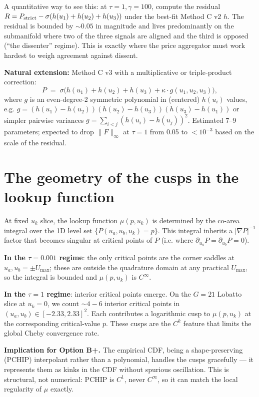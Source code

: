 \documentclass[11pt]{article}
\begin{document}
A quantitative way to see this: at $\tau = 1, \gamma = 100$, compute
the residual $R = P_{\rm strict} - \sigma(h(u_1) + h(u_2) + h(u_3))$
under the best-fit Method C v2 $h$. The residual is bounded by
$\sim 0.05$ in magnitude and lives predominantly on the submanifold
where two of the three signals are aligned and the third is opposed
(``the dissenter'' regime). This is exactly where the price aggregator
must work hardest to weigh agreement against dissent.

\textbf{Natural extension:} Method C v3 with a multiplicative or
triple-product correction:
\[
  P \;=\; \sigma\bigl(h(u_1) + h(u_2) + h(u_3) + \kappa \cdot g(u_1, u_2, u_3)\bigr),
\]
where $g$ is an even-degree-2 symmetric polynomial in (centered)
$h(u_i)$ values, e.g. $g = (h(u_1) - h(u_2))(h(u_2) - h(u_3))(h(u_3) - h(u_1))$
or simpler pairwise variances $g = \sum_{i < j} (h(u_i) - h(u_j))^2$.
Estimated 7--9 parameters; expected to drop $\|F\|_\infty$ at $\tau{=}1$
from 0.05 to $< 10^{-3}$ based on the scale of the residual.

\section{The geometry of the cusps in the lookup function}

At fixed $u_k$ slice, the lookup function $\mu(p, u_k)$ is determined
by the co-area integral over the 1D level set $\{P(u_a, u_b, u_k) = p\}$.
This integral inherits a $|\nabla P|^{-1}$ factor that becomes singular
at critical points of $P$ (i.e. where $\partial_{u_a} P = \partial_{u_b} P = 0$).

\textbf{In the $\tau = 0.001$ regime}: the only critical points are
the corner saddles at $u_a, u_b = \pm U_{\max}$; these are outside the
quadrature domain at any practical $U_{\max}$, so the integral is
bounded and $\mu(p, u_k)$ is $C^\infty$.

\textbf{In the $\tau = 1$ regime}: interior critical points emerge.
On the $G{=}21$ Lobatto slice at $u_k = 0$, we count $\sim 4{-}6$
interior critical points in $(u_a, u_b) \in [-2.33, 2.33]^2$. Each
contributes a logarithmic cusp to $\mu(p, u_k)$ at the corresponding
critical-value $p$. These cusps are the $C^k$ feature that limits
the global Cheby convergence rate.

\textbf{Implication for Option B+.} The empirical CDF, being a
shape-preserving (PCHIP) interpolant rather than a polynomial, handles
the cusps gracefully --- it represents them as kinks in the CDF without
spurious oscillation. This is structural, not numerical: PCHIP is
$C^1$, never $C^\infty$, so it can match the local regularity of
$\mu$ exactly.
\end{document}

